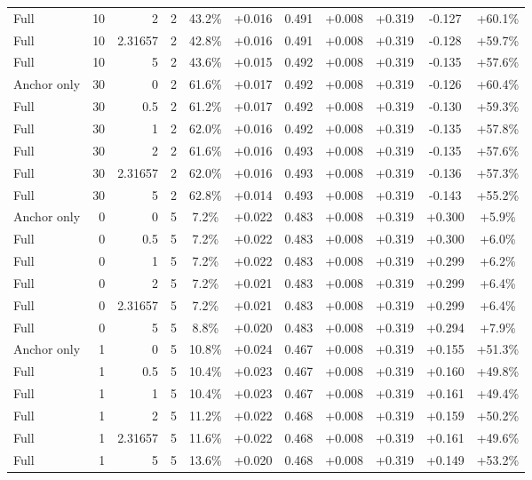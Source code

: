 \begin{table}[htbp]
\begin{tabular}{lrrrccccccc}
Full & 10 & 2 & 2 & 43.2\% & +0.016 & 0.491 & +0.008 & +0.319 & -0.127 & +60.1\% \\
Full & 10 & 2.31657 & 2 & 42.8\% & +0.016 & 0.491 & +0.008 & +0.319 & -0.128 & +59.7\% \\
Full & 10 & 5 & 2 & 43.6\% & +0.015 & 0.492 & +0.008 & +0.319 & -0.135 & +57.6\% \\
Anchor only & 30 & 0 & 2 & 61.6\% & +0.017 & 0.492 & +0.008 & +0.319 & -0.126 & +60.4\% \\
Full & 30 & 0.5 & 2 & 61.2\% & +0.017 & 0.492 & +0.008 & +0.319 & -0.130 & +59.3\% \\
Full & 30 & 1 & 2 & 62.0\% & +0.016 & 0.492 & +0.008 & +0.319 & -0.135 & +57.8\% \\
Full & 30 & 2 & 2 & 61.6\% & +0.016 & 0.493 & +0.008 & +0.319 & -0.135 & +57.6\% \\
Full & 30 & 2.31657 & 2 & 62.0\% & +0.016 & 0.493 & +0.008 & +0.319 & -0.136 & +57.3\% \\
Full & 30 & 5 & 2 & 62.8\% & +0.014 & 0.493 & +0.008 & +0.319 & -0.143 & +55.2\% \\
Anchor only & 0 & 0 & 5 & 7.2\% & +0.022 & 0.483 & +0.008 & +0.319 & +0.300 & +5.9\% \\
Full & 0 & 0.5 & 5 & 7.2\% & +0.022 & 0.483 & +0.008 & +0.319 & +0.300 & +6.0\% \\
Full & 0 & 1 & 5 & 7.2\% & +0.022 & 0.483 & +0.008 & +0.319 & +0.299 & +6.2\% \\
Full & 0 & 2 & 5 & 7.2\% & +0.021 & 0.483 & +0.008 & +0.319 & +0.299 & +6.4\% \\
Full & 0 & 2.31657 & 5 & 7.2\% & +0.021 & 0.483 & +0.008 & +0.319 & +0.299 & +6.4\% \\
Full & 0 & 5 & 5 & 8.8\% & +0.020 & 0.483 & +0.008 & +0.319 & +0.294 & +7.9\% \\
Anchor only & 1 & 0 & 5 & 10.8\% & +0.024 & 0.467 & +0.008 & +0.319 & +0.155 & +51.3\% \\
Full & 1 & 0.5 & 5 & 10.4\% & +0.023 & 0.467 & +0.008 & +0.319 & +0.160 & +49.8\% \\
Full & 1 & 1 & 5 & 10.4\% & +0.023 & 0.467 & +0.008 & +0.319 & +0.161 & +49.4\% \\
Full & 1 & 2 & 5 & 11.2\% & +0.022 & 0.468 & +0.008 & +0.319 & +0.159 & +50.2\% \\
Full & 1 & 2.31657 & 5 & 11.6\% & +0.022 & 0.468 & +0.008 & +0.319 & +0.161 & +49.6\% \\
Full & 1 & 5 & 5 & 13.6\% & +0.020 & 0.468 & +0.008 & +0.319 & +0.149 & +53.2\% \\

\end{tabular}
\end{table}
